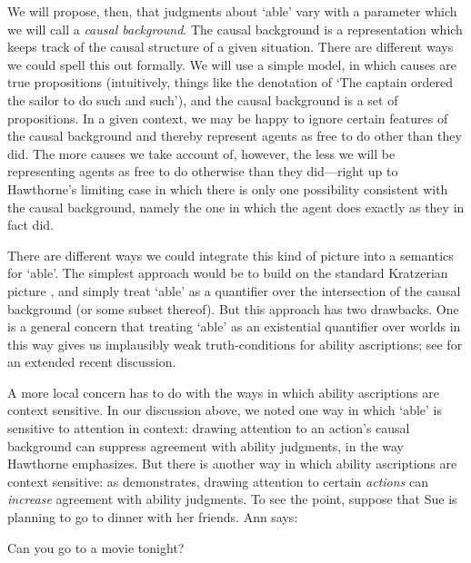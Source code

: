 \documentclass{salt}
\begin{document}
We will propose, then, that judgments about `able' vary with a parameter which we will call a \emph{causal background}. The causal background is a representation which keeps track of the causal structure of a given situation. There are different ways we could spell this out formally. We will use a simple model, in which causes are true propositions (intuitively, things like the denotation of `The captain ordered the sailor to do such and such'), and the causal background is a set of propositions. In a given context, we may be happy to ignore certain features of the causal background and thereby represent agents as free to do other than they did. The more causes we take account of, however, the less we will be representing agents as free to do otherwise than they did---right up to Hawthorne's limiting case in which there is only one possibility consistent with the causal background, namely the one in which the agent does exactly as they in fact did. 

There are different ways we could integrate this kind of picture into a semantics for `able'. The simplest approach would be to build on the standard Kratzerian picture \citep{Kratzer1977,Kratzer:1981}, and simply treat `able' as a quantifier over the intersection of the causal background (or some subset thereof). But this approach has two drawbacks. One is a general concern that treating `able' as an existential quantifier over worlds in this way gives us implausibly weak truth-conditions for ability ascriptions; see \citealt{Mandelkern:2017b} for an extended recent discussion. 

A more local concern has to do with the ways in which ability ascriptions are context sensitive. In our discussion above, we noted one way in which `able' is sensitive to attention in context: drawing attention to an action's causal background can suppress agreement with ability judgments, in the way Hawthorne emphasizes. But there is another way in which ability ascriptions are context sensitive: as \citet{Mandelkern:2017b} demonstrates, drawing attention to certain \emph{actions} can \emph{increase} agreement with ability judgments. To see the point, suppose that Sue is planning to go to dinner with her friends. Ann says: 

\begin{exe}\ex Can you go to a movie tonight?\label{ann1}\end{exe}
\end{document}
